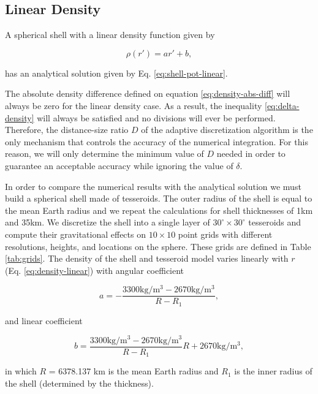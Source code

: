 \documentclass[extra, referee]{gji}
\begin{document}
\subsection{Linear Density}

A spherical shell with a linear density function given by

\begin{equation}
    \rho(r') = ar' + b,
    \label{eq:density-linear}
\end{equation}

\noindent
has an analytical solution given by Eq. \ref{eq:shell-pot-linear}.

The absolute density difference defined on equation
\ref{eq:density-abs-diff} will always be zero for the linear density case.
As a result, the inequality \ref{eq:delta-density} will always be satisfied and no
divisions will ever be performed.
Therefore, the distance-size ratio $D$ of the adaptive discretization algorithm is the
only mechanism that controls the accuracy of the numerical integration.
For this reason, we will only determine the minimum value of $D$ needed in order to
guarantee an acceptable accuracy while ignoring the value of $\delta$.

In order to compare the numerical results with the analytical solution we
must build a spherical shell made of tesseroids.
The outer radius of the shell is equal to the mean Earth radius and we repeat the
calculations for shell thicknesses of 1km and 35km.
We discretize the shell into a single layer of $30^\circ \times 30^\circ$ tesseroids and
compute their gravitational effects on $10 \times 10$ point grids with different
resolutions, heights, and locations on the sphere.
These grids are defined in Table \ref{tab:grids}.
The density of the shell and tesseroid model varies linearly with $r$
(Eq. \ref{eq:density-linear}) with angular coefficient

\begin{equation}
    a = -\frac{3300\text{kg/m$^3$} - 2670\text{kg/m$^3$}}{R - R_1},
\end{equation}

\noindent and linear coefficient

\begin{equation}
    b = \frac{3300\text{kg/m$^3$} -
        2670\text{kg/m$^3$}}{R - R_1} R +
        2670\text{kg/m$^3$},
\end{equation}

\noindent
in which $R$ = 6378.137 km is the mean Earth radius and $R_1$ is the inner radius of the
shell (determined by the thickness).
\end{document}
